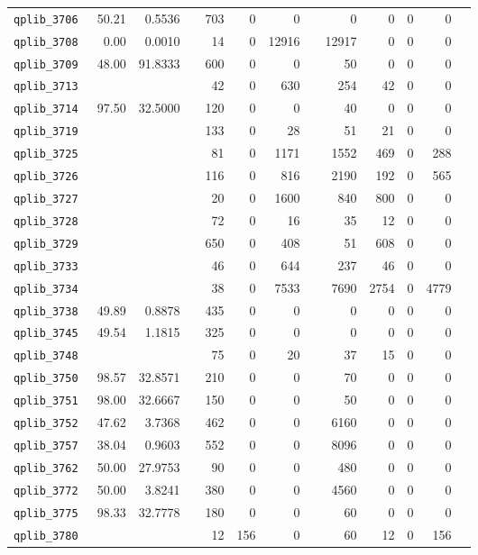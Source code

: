 \begin{longtable}{lrrrrrrrrrrrr}
{\tt 	qplib\_3706	}	&	50.21	&	0.5536	&	&	703	&	0	&	0	&	&	0	&	0	&	0	&	0	\\
{\tt 	qplib\_3708	}	&	0.00	&	0.0010	&	&	14	&	0	&	12916	&	&	12917	&	0	&	0	&	0	\\
{\tt 	qplib\_3709	}	&	48.00	&	91.8333	&	&	600	&	0	&	0	&	&	50	&	0	&	0	&	0	\\
{\tt 	qplib\_3713	}	&		&		&	&	42	&	0	&	630	&	&	254	&	42	&	0	&	0	\\
{\tt 	qplib\_3714	}	&	97.50	&	32.5000	&	&	120	&	0	&	0	&	&	40	&	0	&	0	&	0	\\
{\tt 	qplib\_3719	}	&		&		&	&	133	&	0	&	28	&	&	51	&	21	&	0	&	0	\\
{\tt 	qplib\_3725	}	&		&		&	&	81	&	0	&	1171	&	&	1552	&	469	&	0	&	288	\\
{\tt 	qplib\_3726	}	&		&		&	&	116	&	0	&	816	&	&	2190	&	192	&	0	&	565	\\
{\tt 	qplib\_3727	}	&		&		&	&	20	&	0	&	1600	&	&	840	&	800	&	0	&	0	\\
{\tt 	qplib\_3728	}	&		&		&	&	72	&	0	&	16	&	&	35	&	12	&	0	&	0	\\
{\tt 	qplib\_3729	}	&		&		&	&	650	&	0	&	408	&	&	51	&	608	&	0	&	0	\\
{\tt 	qplib\_3733	}	&		&		&	&	46	&	0	&	644	&	&	237	&	46	&	0	&	0	\\
{\tt 	qplib\_3734	}	&		&		&	&	38	&	0	&	7533	&	&	7690	&	2754	&	0	&	4779	\\
{\tt 	qplib\_3738	}	&	49.89	&	0.8878	&	&	435	&	0	&	0	&	&	0	&	0	&	0	&	0	\\
{\tt 	qplib\_3745	}	&	49.54	&	1.1815	&	&	325	&	0	&	0	&	&	0	&	0	&	0	&	0	\\
{\tt 	qplib\_3748	}	&		&		&	&	75	&	0	&	20	&	&	37	&	15	&	0	&	0	\\
{\tt 	qplib\_3750	}	&	98.57	&	32.8571	&	&	210	&	0	&	0	&	&	70	&	0	&	0	&	0	\\
{\tt 	qplib\_3751	}	&	98.00	&	32.6667	&	&	150	&	0	&	0	&	&	50	&	0	&	0	&	0	\\
{\tt 	qplib\_3752	}	&	47.62	&	3.7368	&	&	462	&	0	&	0	&	&	6160	&	0	&	0	&	0	\\
{\tt 	qplib\_3757	}	&	38.04	&	0.9603	&	&	552	&	0	&	0	&	&	8096	&	0	&	0	&	0	\\
{\tt 	qplib\_3762	}	&	50.00	&	27.9753	&	&	90	&	0	&	0	&	&	480	&	0	&	0	&	0	\\
{\tt 	qplib\_3772	}	&	50.00	&	3.8241	&	&	380	&	0	&	0	&	&	4560	&	0	&	0	&	0	\\
{\tt 	qplib\_3775	}	&	98.33	&	32.7778	&	&	180	&	0	&	0	&	&	60	&	0	&	0	&	0	\\
{\tt 	qplib\_3780	}	&		&		&	&	12	&	156	&	0	&	&	60	&	12	&	0	&	156	\\

\end{longtable}
